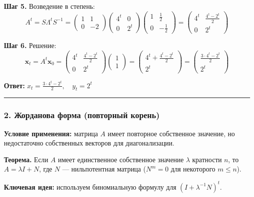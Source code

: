 \begin{center}
{{\textbf{Шаг 5.} Возведение в степень:
\[
A^t = S\Lambda^t S^{-1} = \begin{pmatrix} 1 & 1 \\ 0 & -2 \end{pmatrix}\begin{pmatrix} 4^t & 0 \\ 0 & 2^t \end{pmatrix}\begin{pmatrix} 1 & \frac{1}{2} \\ 0 & -\frac{1}{2} \end{pmatrix} = \begin{pmatrix} 4^t & \frac{4^t - 2^t}{2} \\ 0 & 2^t \end{pmatrix}
\]

\textbf{Шаг 6.} Решение:
\[
\mathbf{x}_t = A^t\mathbf{x}_0 = \begin{pmatrix} 4^t & \frac{4^t - 2^t}{2} \\ 0 & 2^t \end{pmatrix}\begin{pmatrix} 1 \\ 1 \end{pmatrix} = \begin{pmatrix} 4^t + \frac{4^t - 2^t}{2} \\ 2^t \end{pmatrix} = \begin{pmatrix} \frac{3 \cdot 4^t - 2^t}{2} \\ 2^t \end{pmatrix}
\]

\textbf{Ответ:} $\boxed{x_t = \frac{3 \cdot 4^t - 2^t}{2}, \quad y_t = 2^t}$
}}
\end{center}

\bigskip
\hrule
\bigskip

\subsubsection*{2. Жорданова форма (повторный корень)}

\textbf{Условие применения:} матрица $A$ имеет повторное собственное значение, но недостаточно собственных векторов для диагонализации.

\textbf{Теорема.} Если $A$ имеет единственное собственное значение $\lambda$ кратности $n$, то $A = \lambda I + N$, где $N$ — нильпотентная матрица ($N^m = 0$ для некоторого $m \leq n$).

\textbf{Ключевая идея:} используем биномиальную формулу для $(I + \lambda^{-1}N)^t$.


